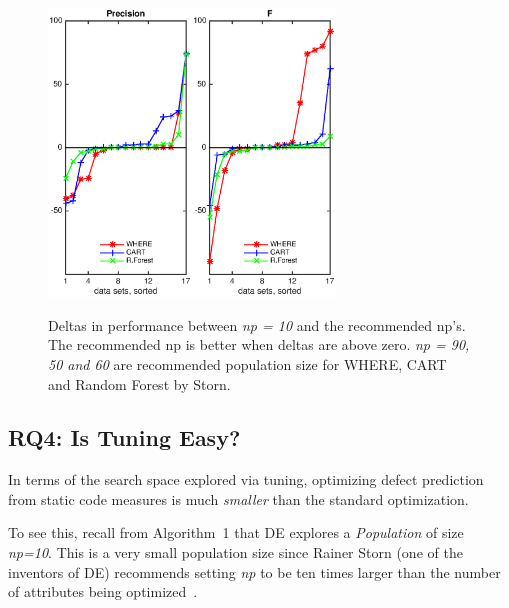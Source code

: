 \documentclass{sig-alternative}
\begin{document}
\begin{figure}[!t]
\begin{center}
\includegraphics[width=1.5in]{./eps/np_precision.eps}\includegraphics[width=1.5in]{./eps/np_f.eps}
 \end{center}
\caption{Deltas in performance between {\em np = 10} and the recommended np's. The recommended np is better when deltas are above zero. {\em np = 90, 50 and 60} are recommended population size for WHERE, CART and Random Forest by Storn.}\label{fig:deltas_np}
 \end{figure}



\subsection{RQ4: Is Tuning Easy?}\label{sect:easy}

In terms of the search space
explored via tuning, optimizing defect prediction from static code
measures is much {\em smaller} than the standard optimization.

To see this,
recall from Algorithm~1 that
DE explores a {\em Population} of size {\em np=10}. This is a very small population size since
Rainer Storn (one of the inventors of DE) recommends  setting {\em np} to be ten times larger than the number
of attributes being optimized~\cite{storn1997differential}.
\end{document}
